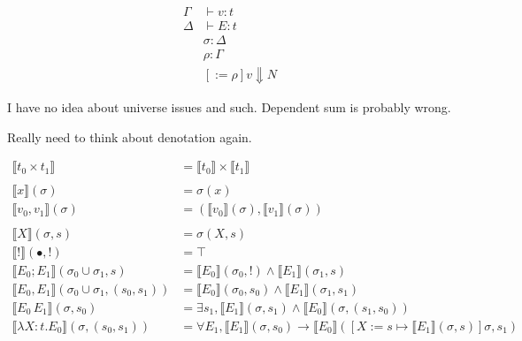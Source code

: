 \documentclass{scrartcl}
\DeclareMathOperator{\unit}{\textbf{I}}
\DeclareMathOperator{\coin}{\textbf{!}}
\newcommand{\update}{\mathbin{:=}}
\begin{document}
\begin{center}

  \begin{align*}
  \Gamma & \vdash v \colon t \\
  \Delta & \vdash E \colon t \\
  & \sigma \colon \Delta \\
  & \rho \colon \Gamma \\
  & [:=\rho]v \Downarrow N
  \end{align*}

\end{center}

I have no idea about universe issues and such. Dependent sum is probably wrong.

Really need to think about denotation again.

\[
\begin{aligned}
  \llbracket t_0 \times t_1 \rrbracket & =\llbracket t_0 \rrbracket \times \llbracket t_1 \rrbracket \\
  \\
  \llbracket x \rrbracket(\sigma) & = \sigma(x) \\
  \llbracket v_0 , v_1 \rrbracket(\sigma) & =( \llbracket v_0 \rrbracket(\sigma) , \llbracket v_1 \rrbracket(\sigma) ) \\
  \\
  \llbracket X \rrbracket(\sigma, s) & = \sigma(X, s) \\
  \llbracket \coin \rrbracket(\bullet, \coin) & = \top \\
  \llbracket E_0 ; E_1 \rrbracket(\sigma_0 \cup \sigma_1, s) & = \llbracket E_0 \rrbracket(\sigma_0, \coin) \wedge \llbracket E_1 \rrbracket(\sigma_1, s) \\
  \llbracket E_0 , E_1 \rrbracket(\sigma_0 \cup \sigma_1, (s_0 , s_1)) & = \llbracket E_0 \rrbracket(\sigma_0, s_0) \wedge \llbracket E_1 \rrbracket(\sigma_1, s_1) \\
  \llbracket E_0 \, E_1 \rrbracket(\sigma, s_0) & = \exists s_1,  \llbracket E_1 \rrbracket (\sigma, s_1) \wedge \llbracket E_0 \rrbracket (\sigma, (s_1, s_0))\\
  \llbracket \lambda{} X \colon t . E_0 \rrbracket(\sigma, (s_0, s_1)) & = \forall E_1, \llbracket E_1 \rrbracket (\sigma, s_0) \rightarrow \llbracket E_0 \rrbracket ([X \update  s \mapsto \llbracket E_1 \rrbracket(\sigma, s)] \sigma, s_1) 
\end{aligned}
\]
\end{document}
